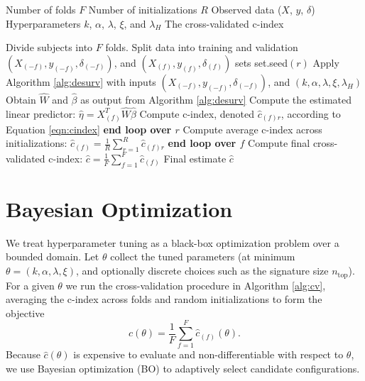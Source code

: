 \documentclass[
]{article}
\begin{document}
\begin{algorithm}[H]
\caption{Cross-validation for DeSurv pipeline}
\label{alg:cv}
\begin{algorithmic}[1]
\Require
\Statex Number of folds $F$
\Statex Number of initializations $R$
\Statex Observed data ($X$, $y$, $\delta$)
\Statex Hyperparameters $k$, $\alpha$, $\lambda$, $\xi$, and $\lambda_H$
\Ensure The cross-validated c-index

\State Divide subjects into $F$ folds.
    \State Split data into training and validation $(X_{(-f)},y_{(-f)}, \delta_{(-f)})$, and $(X_{(f)},y_{(f)}, \delta_{(f)})$ sets
        \State set.seed$(r)$
        \State Apply Algorithm \ref{alg:desurv} with inputs $(X_{(-f)},y_{(-f)}, \delta_{(-f)})$, and $(k, \alpha, \lambda, \xi, \lambda_H)$
        \State Obtain $\hat{W}$ and $\hat{\beta}$ as output from Algorithm \ref{alg:desurv}
        \State Compute the estimated linear predictor:
        $
        \hat{\eta} = X_{(f)}^T\hat{W}\hat{\beta}
        $
        \State Compute c-index, denoted $\hat{c}_{(f)r}$, according to Equation \ref{eqn:cindex}
    \EndFor
    \State \textbf{end loop over $r$}
    \State Compute average c-index across initializations:
    $
    \hat{c}_{(f)} = \frac{1}{R}\sum_{r=1}^R\hat{c}_{(f)r}
    $
\EndFor
\State \textbf{end loop over $f$}
\State Compute final cross-validated c-index:
$
\hat{c} = \frac{1}{F}\sum_{f=1}^F \hat{c}_{(f)}
$
\State \Return Final estimate $\hat{c}$

\end{algorithmic}
\end{algorithm}

\section{Bayesian Optimization}

We treat hyperparameter tuning as a black-box optimization problem over
a bounded domain. Let \(\theta\) collect the tuned parameters (at
minimum \(\theta = (k,\alpha,\lambda,\xi)\), and optionally discrete
choices such as the signature size \(n_{\text{top}}\)). For a given
\(\theta\) we run the cross-validation procedure in Algorithm
\ref{alg:cv}, averaging the c-index across folds and random
initializations to form the objective \[
\hat{c}(\theta) = \frac{1}{F} \sum_{f=1}^F \hat{c}_{(f)}(\theta).
\] Because \(\hat{c}(\theta)\) is expensive to evaluate and
non-differentiable with respect to \(\theta\), we use Bayesian
optimization (BO) to adaptively select candidate configurations.
\end{document}
